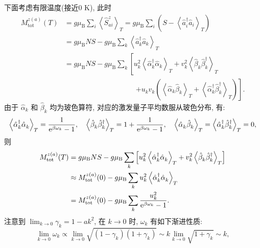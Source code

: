 下面考虑有限温度(接近0 K), 此时 
\begin{align}
        M_{\mathrm{tot}}^{z(a)}(T)&=g \mu_{\mathrm{B}} \sum_{i}\left\langle\hat{S}_{a i}^{z}\right\rangle_{T}=g \mu_{\mathrm{B}} \sum_{i}\left({S}-\left\langle\hat{a}_{i}^{\dagger} \hat{a}^{}_{i}\right\rangle_{T}\right) \nonumber\\
        &=g \mu_{\mathrm{B}} N S-g \mu_{\mathrm{B}} \sum_{k}\left\langle\hat{a}_{k}^{\dagger} \hat{a}^{}_{k}\right\rangle_{T}\nonumber\\
        &=g \mu_{\mathrm{B}} N S-g \mu_{\mathrm{B}} \sum_{k}\left[u_{k}^{2}\left\langle\hat{\alpha}_{k}^{\dagger} \hat{\alpha}^{}_{k}\right\rangle_{T}+v_{k}^{2}\left\langle\hat{\beta}_{k}^{} \hat{\beta}^{\dagger}_{k}\right\rangle_{T}\right.\nonumber\\
        &\qquad\qquad\qquad\qquad\qquad \left.+u_{k}^{}v_{k}^{}\left(\left\langle\hat{\alpha}_{k}^{} \hat{\beta}^{}_{k}\right\rangle_{T}+\left\langle\hat{\alpha}_{k}^{\dagger} \hat{\beta}^{\dagger}_{k}\right\rangle_{T}\right)\right].
        \end{align}
由于 $\hat{\alpha}_{k}$ 和 $\hat{\beta}_{k}$ 均为玻色算符, 对应的激发量子平均数服从玻色分布, 有:
\begin{equation}
\left\langle\hat{\alpha}_{k}^{\dagger} \hat{\alpha}^{}_{k}\right\rangle_{T}=\frac{1}{\mathrm{e}^{\beta\omega_{k}}-1},\quad
\left\langle\hat{\beta}_{k}^{} \hat{\beta}^{\dagger}_{k}\right\rangle_{T}=1+\frac{1}{\mathrm{e}^{\beta\omega_{k}}-1},\quad
\left\langle\hat{\alpha}_{k}^{} \hat{\beta}^{}_{k}\right\rangle_{T}=\left\langle\hat{\alpha}_{k}^{\dagger} \hat{\beta}^{\dagger}_{k}\right\rangle_{T}=0,
\end{equation}
则
\begin{align}
M_{\mathrm{tot}}^{z(a)}(T)&=g \mu_{\mathrm{B}} N S-g \mu_{\mathrm{B}} \sum_{k}\left[u_{k}^{2}\left\langle\hat{\alpha}_{k}^{\dagger} \hat{\alpha}^{}_{k}\right\rangle_{T}+v_{k}^{2}\left\langle\hat{\beta}_{k}^{} \hat{\beta}^{\dagger}_{k}\right\rangle_{T}\right]\nonumber\\
&\approx M_{\mathrm{tot}}^{z(a)}(0)-g \mu_{\mathrm{B}}\sum_{k}u_{k}^{2}\left\langle\hat{\alpha}_{k}^{\dagger} \hat{\alpha}^{}_{k}\right\rangle_{T}\nonumber\\
&=M_{\mathrm{tot}}^{z(a)}(0)-g \mu_{\mathrm{B}}\sum_{k}\frac{u_{k}^{2}}{\mathrm{e}^{\beta\omega_{k}}-1}.
\end{align}
注意到 $\displaystyle\lim _{k \rightarrow 0}\gamma_k =1-ak^2$, 在 $k \rightarrow 0$ 时, $\omega_{k}$ 有如下渐进性质:
\begin{equation}
\lim _{k \rightarrow 0} \omega_{k}\propto \lim _{k \rightarrow 0}  \sqrt{\left(1-\gamma_{k}\right)\left(1+\gamma_{k}\right)} \sim  k \lim _{k \rightarrow 0} \sqrt{1+\gamma_{k}} \sim k,
\end{equation}
